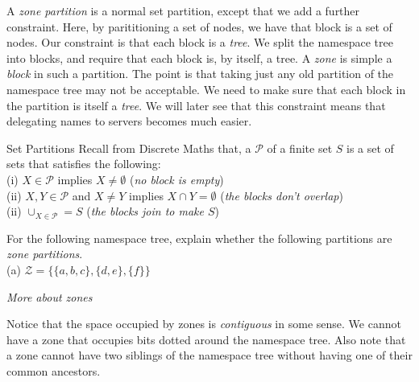 
A \textit{zone partition} is a normal set partition, except that we add a further 
constraint. Here, by parititioning a set of nodes, 
we have that block is a set of nodes. Our constraint is that 
each block is a \textit{tree}. We split the namespace tree into blocks, and require 
that each block is, by itself, a tree.
A \textit{zone} is simple a \textit{block} in such a partition. 
The point is that taking just any old partition of the namespace tree may not be acceptable. 
We need to make sure that each block in the partition is itself a \textit{tree}. 
We will later see that this constraint means that delegating names 
to servers becomes much easier.

\begin{sidenote}{Set Partitions} 
Recall from Discrete Maths that, a  $\mathcal{P}$ of a finite set $S$ is a set of sets 
that satisfies the following:\\
(i) $X \in \mathcal{P}$ implies $X \neq \emptyset$ (\textit{no block is empty})\\
(ii) $X,Y \in \mathcal{P}$ and $X \neq Y$ implies $X \cap Y = \emptyset$ (\textit{the blocks don't overlap})\\
(ii) $\cup_{X \in \mathcal{P}} = S$ (\textit{the blocks join to make $S$})
\end{sidenote}

\frmrule 

\begin{example}
For the following namespace tree, explain whether the following partitions 
are \textit{zone partitions}. \\
(a) $\mathcal{Z} = \{\{a,b,c\},\{d,e\},\{f\}\}$
\end{example}


\frmrule

\textit{More about zones}

Notice that the space occupied by zones is \textit{contiguous} in some sense. 
We cannot have a zone that occupies bits dotted around the namespace 
tree. Also note that a zone cannot have two siblings of the namespace tree without 
having one of their common ancestors. 

